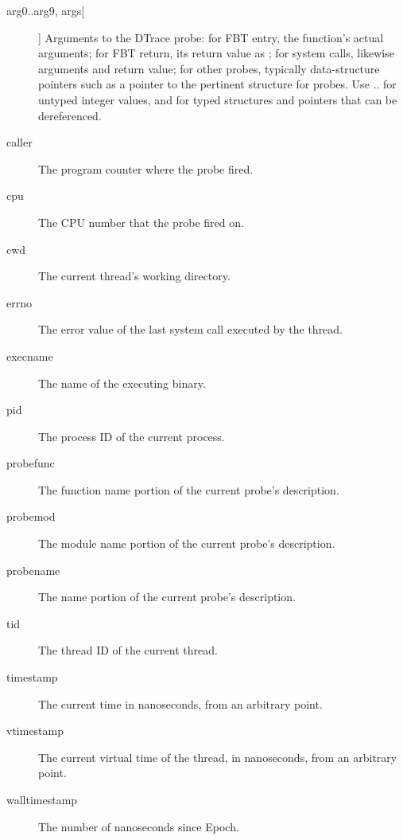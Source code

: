 \documentclass[a4paper,10pt]{article}
\begin{document}
\begin{description}
\item[arg0..arg9, args[]] Arguments to the DTrace probe: for FBT entry, the
  function's actual arguments; for FBT return, its return value as
  ; for system calls, likewise arguments and return value; for
  other probes, typically data-structure pointers such as a pointer to the
  pertinent  structure for  probes.
  Use .. for untyped integer values, and
   for typed structures and pointers that can be dereferenced.

\item[caller] The program counter where the probe fired.

\item[cpu] The CPU number that the probe fired on.

\item[cwd] The current thread's working directory.

\item[errno] The error value of the last system call executed by the thread.

\item[execname] The name of the executing binary.

\item[pid] The process ID of the current process.

\item[probefunc] The function name portion of the current probe's description.

\item[probemod] The module name portion of the current probe's description.

\item[probename] The name portion of the current probe's description.

\item[tid] The thread ID of the current thread.

\item[timestamp] The current time in nanoseconds, from an arbitrary point.

\item[vtimestamp] The current virtual time of the thread, in nanoseconds,
  from an arbitrary point.

\item[walltimestamp] The number of nanoseconds since Epoch.
\end{description}
\end{document}
